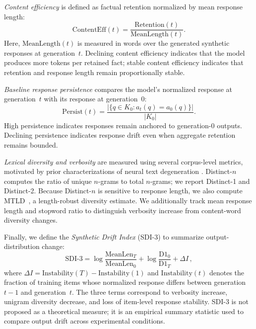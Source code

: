 \documentclass[a4paper,fleqn]{cas-dc}
\begin{document}
\textit{Content efficiency} is defined as factual retention normalized by mean
response length:
\begin{equation}\label{eq:efficiency}
    \mathrm{ContentEff}(t) =
    \frac{\mathrm{Retention}(t)}{\mathrm{MeanLength}(t)}.
\end{equation}
Here, $\mathrm{MeanLength}(t)$ is measured in words over the generated synthetic
responses at generation~$t$. Declining content efficiency indicates that the
model produces more tokens per retained fact; stable content efficiency indicates
that retention and response length remain proportionally stable.

\textit{Baseline response persistence} compares the model's normalized response
at generation~$t$ with its response at generation~0:
\begin{equation}\label{eq:persistence}
    \mathrm{Persist}(t) =
    \frac{|\{q \in K_0 : a_t(q) = a_0(q)\}|}{|K_0|}.
\end{equation}
High persistence indicates responses remain anchored to generation-0 outputs.
Declining persistence indicates response drift even when aggregate retention
remains bounded.

\textit{Lexical diversity and verbosity} are measured using several corpus-level
metrics, motivated by prior characterizations of neural text degeneration
\citep{holtzman2020}. Distinct-$n$~\citep{li2016} computes the ratio of unique
$n$-grams to
total $n$-grams; we report Distinct-1 and Distinct-2. Because Distinct-$n$ is
sensitive to response length, we also compute
MTLD~\citep{mccarthy2010}, a length-robust diversity estimate. We additionally
track mean response length and stopword ratio to distinguish verbosity increase
from content-word diversity changes.

Finally, we define the \textit{Synthetic Drift Index} (SDI-3) to summarize
output-distribution change:
\begin{equation}\label{eq:sdi}
    \mathrm{SDI\text{-}3} =
    \log\frac{\mathrm{MeanLen}_T}{\mathrm{MeanLen}_0}
    + \log\frac{\mathrm{D1}_0}{\mathrm{D1}_T}
    + \Delta I\,,
\end{equation}
where $\Delta I = \mathrm{Instability}(T) -
\mathrm{Instability}(1)$ and $\mathrm{Instability}(t)$ denotes the fraction of
training items whose normalized response differs between generation~$t{-}1$ and
generation~$t$. The three terms correspond to verbosity increase, unigram
diversity decrease, and loss of item-level response stability. SDI-3 is not
proposed as a theoretical measure; it is an empirical summary statistic used to
compare output drift across experimental conditions.
\end{document}
